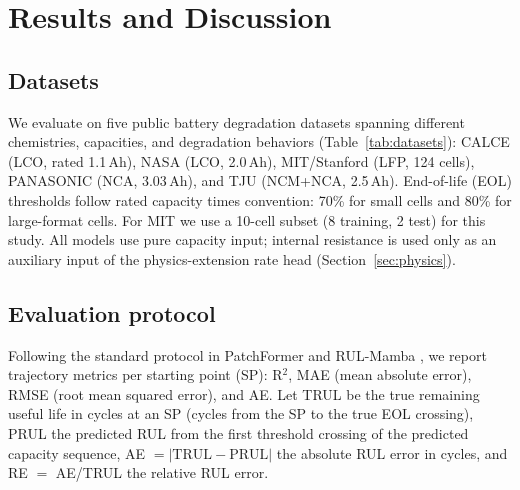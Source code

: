 \section{Results and Discussion}
\label{sec:exp}

\subsection{Datasets}
\label{sec:datasets}

We evaluate on five public battery degradation datasets spanning
different chemistries, capacities, and degradation behaviors
(Table~\ref{tab:datasets}): CALCE (LCO, rated 1.1\,Ah), NASA
\cite{ref_nasa_data} (LCO, 2.0\,Ah), MIT/Stanford \cite{ref_severson}
(LFP, 124 cells), PANASONIC (NCA, 3.03\,Ah), and TJU (NCM+NCA,
2.5\,Ah). End-of-life (EOL) thresholds follow rated
capacity times convention: 70\% for small cells and 80\% for
large-format cells. For MIT we use a 10-cell subset (8 training, 2 test) for this study.
All models use pure capacity input; internal resistance is used only
as an auxiliary input of the physics-extension rate head
(Section~\ref{sec:physics}).

\begin{table}[htbp]
\centering
\caption{Dataset overview.}
\label{tab:datasets}
\end{table}

\subsection{Evaluation protocol}
\label{sec:protocol}

Following the standard protocol in PatchFormer \cite{ref_patchformer}
and RUL-Mamba \cite{ref_rulmamba}, we report trajectory
metrics per starting point (SP): R$^2$, MAE (mean absolute error),
RMSE (root mean squared error), and AE. Let TRUL be the true
remaining useful life in cycles at an SP (cycles from the SP to the
true EOL crossing), PRUL the predicted RUL from the first threshold
crossing of the predicted capacity sequence, AE $= |\text{TRUL} -
\text{PRUL}|$ the absolute RUL error in cycles, and RE $=$
AE/TRUL the relative RUL error.

